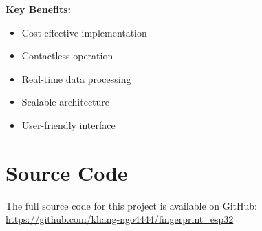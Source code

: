 \documentclass[10pt,a4paper]{article}
\begin{document}
\textbf{Key Benefits:}
\begin{itemize}
    \item Cost-effective implementation
    \item Contactless operation
    \item Real-time data processing
    \item Scalable architecture
    \item User-friendly interface
\end{itemize}

\section*{Source Code}
The full source code for this project is available on GitHub: \url{https://github.com/khang-ngo4444/fingerprint_esp32}
\end{document}
